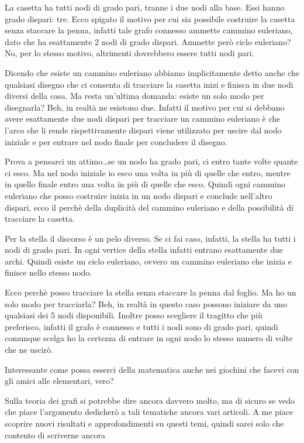La casetta ha tutti nodi di grado pari, tranne i due nodi alla base. Essi hanno grado dispari: tre. Ecco spigato il motivo per cui sia possibile costruire la casetta senza staccare la penna, infatti tale grafo connesso ammette cammino euleriano, dato che ha esattamente 2 nodi di grado dispari. Ammette però ciclo euleriano? No, per lo stesso motivo, altrimenti dovrebbero essere tutti nodi pari.

Dicendo che esiste un cammino euleriano abbiamo implicitamente detto anche che qualsiasi disegno che ci consenta di tracciare la casetta inizi e finisca in due nodi diversi della casa. Ma resta un’ultima domanda: esiste un solo modo per disegnarla? Beh, in realtà ne esistono due. Infatti il motivo per cui si debbano avere esattamente due nodi dispari per tracciare un cammino euleriano è che l’arco che li rende rispettivamente dispari viene utilizzato per uscire dal nodo iniziale e per entrare nel nodo finale per concludere il disegno.

Prova a pensarci un attimo…se un nodo ha grado pari, ci entro tante volte quante ci esco. Ma nel nodo iniziale io esco una volta in più di quelle che entro, mentre in quello finale entro una volta in più di quelle che esco. Quindi ogni cammino euleriano che posso costruire inizia in un nodo dispari e conclude nell’altro dispari, ecco il perchè della duplicità del cammino euleriano e della possibilità di tracciare la casetta.

Per la stella il discorso è un pelo diverso. Se ci fai caso, infatti, la stella ha tutti i nodi di grado pari. In ogni vertice della stella infatti entrano esattamente due archi. Quindi esiste un ciclo euleriano, ovvero un cammino euleriano che inizia e finisce nello stesso nodo.

Ecco perchè posso tracciare la stella senza staccare la penna dal foglio. Ma ho un solo modo per tracciarla? Beh, in realtà in questo caso possono iniziare da uno qualsiasi dei 5 nodi disponibili. Inoltre posso scegliere il tragitto che più preferisco, infatti il grafo è connesso e tutti i nodi sono di grado pari, quindi comunque scelga ho la certezza di entrare in ogni nodo lo stesso numero di volte che ne uscirò.

Interessante come possa esserci della matematica anche nei giochini che facevi con gli amici alle elementari, vero?

Sulla teoria dei grafi si potrebbe dire ancora davvero molto, ma di sicuro se vedo che piace l’argomento dedicherò a tali tematiche ancora vari articoli. A me piace scoprire nuovi risultati e approfondimenti su questi temi, quindi sarei solo che contento di scriverne ancora


